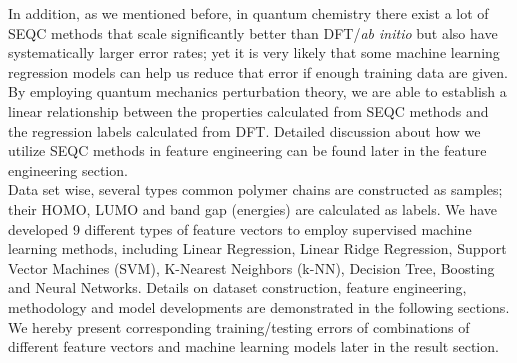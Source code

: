 In addition, as we mentioned before, in quantum chemistry there exist a lot of SEQC methods that scale significantly better than DFT/\textit{ab initio} but also have systematically larger error rates; yet it is very likely that some machine learning regression models can help us reduce that error if enough training data are given. By employing quantum mechanics perturbation theory, we are able to establish a linear relationship between the properties calculated from SEQC methods and the regression labels calculated from DFT. Detailed discussion about how we utilize SEQC methods in feature engineering can be found later in the feature engineering section. \\

Data set wise, several types common polymer chains are constructed as samples; their HOMO, LUMO and band gap (energies) are calculated as labels. We have developed 9 different types of feature vectors to employ supervised machine learning methods, including Linear Regression, Linear Ridge Regression, Support Vector Machines (SVM), K-Nearest Neighbors (k-NN), Decision Tree, Boosting and Neural Networks. Details on dataset construction, feature engineering, methodology and model developments are demonstrated in the following sections. We hereby present corresponding training/testing errors of combinations of different feature vectors and machine learning models later in the result section. \\
